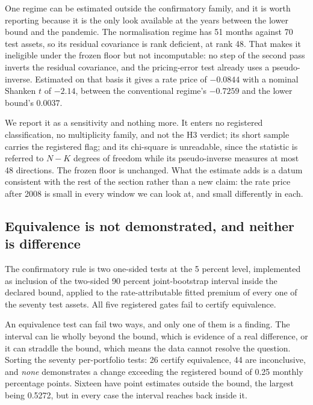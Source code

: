 \documentclass[11pt]{article}
\begin{document}
One regime can be estimated outside the confirmatory family, and it is worth
reporting because it is the only look available at the years between the
lower bound and the pandemic. The normalisation regime has 51 months against %
70 test assets, so its residual covariance is rank deficient, at rank 48. That %
makes it ineligible under the frozen floor but not incomputable: no step of
the second pass inverts the residual covariance, and the pricing-error test
already uses a pseudo-inverse. Estimated on that basis it gives a rate price
of $-0.0844$ with a nominal Shanken $t$ of $-2.14$, between the conventional %
regime's $-0.7259$ and the lower bound's $0.0037$. %

We report it as a sensitivity and nothing more. It enters no registered
classification, no multiplicity family, and not the H3 verdict; its short
sample carries the registered flag; and its chi-square is unreadable, since
the statistic is referred to $N-K$ degrees of freedom while its pseudo-inverse
measures at most 48 directions. The frozen floor is unchanged. What the %
estimate adds is a datum consistent with the rest of the section rather than
a new claim: the rate price after 2008 is small in every window we can look %
at, and small differently in each.
\subsection{Equivalence is not demonstrated, and neither is difference}

The confirmatory rule is two one-sided tests at the 5 percent level, implemented %
as inclusion of the two-sided 90 percent joint-bootstrap interval inside the %
declared bound, applied to the rate-attributable fitted premium of every one of
the seventy test assets. All five registered gates fail to certify equivalence. %

An equivalence test can fail two ways, and only one of them is a finding. The
interval can lie wholly beyond the bound, which is evidence of a real difference,
or it can straddle the bound, which means the data cannot resolve the question.
Sorting the seventy per-portfolio tests: 26 certify equivalence, 44 are %
inconclusive, and \emph{none} demonstrates a change exceeding the registered
bound of 0.25 monthly percentage points. Sixteen have point estimates outside the %
bound, the largest being 0.5272, but in every case the interval reaches back %
inside it. %
\end{document}
